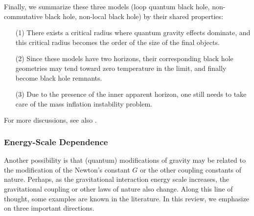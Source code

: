 \documentclass[12pt]{article}
\newcommand{\2}{$^2$}
\newcommand{\3}{$^3$}
\newcommand{\4}{$_4$}
\newcommand{\5}{$_5$}
\begin{document}
Finally, we summarize these three models (loop quantum black hole, non-commutative black hole, non-local black hole) by their shared properties:
\begin{itemize}
\item[(1)] There exists a critical radius where quantum gravity effects dominate, and this critical radius becomes the order of the size of the final objects.
\item[(2)] Since these models have two horizons, their corresponding black hole geometries may tend toward zero temperature in the limit, and finally become black hole remnants.
\item[(3)] Due to the presence of the inner apparent horizon, one still needs to take care of the mass inflation instability problem.
\end{itemize}

For more discussions, see also \cite{1410.1706}.

\subsubsection{Energy-Scale Dependence}

Another possibility is that (quantum) modifications of gravity may be related to the modification of the Newton's constant $G$ or the other coupling constants of nature. Perhaps, as the gravitational interaction energy scale increases, the gravitational coupling or other laws of nature also change. Along this line of thought, some examples are known in the literature. In this review,  we emphasize on three important directions.
\end{document}
